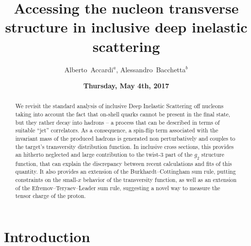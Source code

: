 \documentclass[preprintnumbers,floatfix,nofootinbib]{revtex4}
\begin{document}


\title{Accessing the nucleon transverse structure in inclusive deep inelastic scattering} 

\author{Alberto~Accardi$^{a}$, Alessandro~Bacchetta$^{b}$} 

\date{\bf Thursday, May 4th, 2017}

\begin{abstract}
We revisit the standard analysis of inclusive Deep Inelastic Scattering
off nucleons taking into  account the fact that on-shell quarks cannot be present in the final state, but they rather decay into hadrons --  a process that can be described in terms of suitable ``jet'' correlators. As a consequence, a spin-flip term
associated with the invariant mass of the produced hadrons is generated
non perturbatively and couples to the target's transversity distribution
function. In inclusive cross sections, this provides an hitherto neglected and
large contribution to the twist-3 part of the $g_2$ structure function, that
can explain the discrepancy between recent calculations and fits of this
quantity.  It also provides an extension of the Burkhardt--Cottingham sum rule, putting constraints on the small-$x$ behavior of the transversity function, as well as an extension of the Efremov--Teryaev--Leader sum rule, suggesting a novel way to measure the tensor charge of the proton.
\end{abstract}



\maketitle


\section{Introduction}
\end{document}
